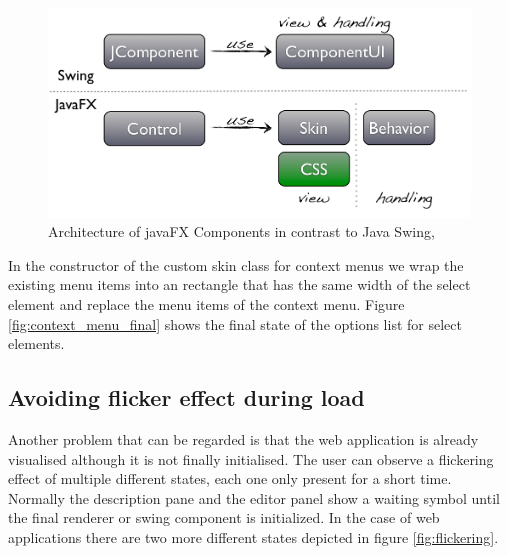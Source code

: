 \begin{figure}
	\centering \includegraphics[width=1.0\textwidth]{./img/impl/fx_components.png}
	\caption{Architecture of javaFX Components in contrast to Java Swing, \autocite{impl:fx-ui-controls}}
	\label{fig:fx-skinning}
\end{figure}

In the constructor of the custom skin class for context menus we wrap the existing menu items into an rectangle that has the same width of the select element and replace the menu items of the context menu. 
Figure \ref{fig:context_menu_final} shows the final state of the options list for select elements.

\subsection{ Avoiding flicker effect during load}

Another problem that can be regarded is that the web application is already visualised although it is not finally initialised.
The user can observe a flickering effect of multiple different states, each one only present for a short time. 
Normally the description pane and the editor panel show a waiting symbol until the final renderer or swing component is initialized. 
In the case of web applications there are two more different states depicted in figure \ref{fig:flickering}.

